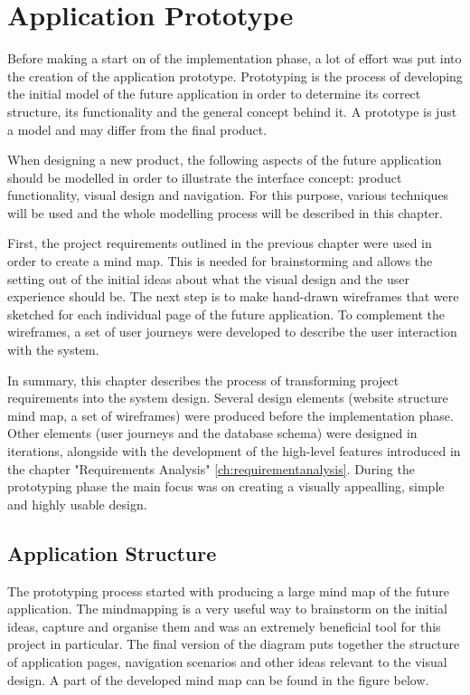\chapter{Application Prototype}
\label{ch:Prototype}
Before making a start on of the implementation phase, a lot of effort was put into the creation of the application prototype. Prototyping is the process of developing the initial model of the future application in order to determine its correct structure, its functionality and the general concept behind it. A prototype is just a model and may differ from the final product.

When designing a new product, the following aspects of the future application should be modelled in order to illustrate the interface concept: product functionality, visual design and navigation. For this purpose, various techniques will be used and the whole modelling process will be described in this chapter. 

First, the project requirements outlined in the previous chapter were used in order to create a mind map. This is needed for brainstorming and allows the setting out of the initial ideas about what the visual design and the user experience should be. The next step is to make hand-drawn wireframes that were sketched for each individual page of the future application. To complement the wireframes, a set of user journeys were developed to describe the user interaction with the system. 

In summary, this chapter describes the process of transforming project requirements into the system design. Several design elements (website structure mind map, a set of wireframes) were produced before the implementation phase. Other elements (user journeys and the database schema) were designed in iterations, alongside with the development of the high-level features introduced in the chapter "Requirements Analysis" \ref{ch:requirementanalysis}. During the prototyping phase the main focus was on creating a visually appealling, simple and highly usable design. 

\section{Application Structure}
\label{sec:applicationstructure_prototype}
The prototyping process started with producing a large mind map of the future application. The mindmapping is a very useful way to brainstorm on the initial ideas, capture and organise them and was an extremely beneficial tool for this project in particular. The final version of the diagram puts together the structure of application pages, navigation scenarios and other ideas relevant to the visual design. A part of the developed mind map can be found in the figure below.

